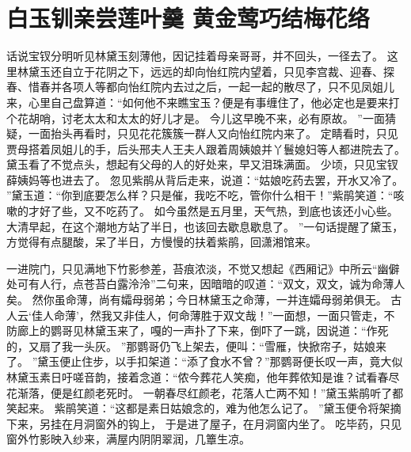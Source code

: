\chapter{白玉钏亲尝莲叶羹 \quad 黄金莺巧结梅花络}
\par
话说宝钗分明听见林黛玉刻薄他，因记挂着母亲哥哥，并不回头，一径去了。
这里林黛玉还自立于花阴之下，远远的却向怡红院内望着，只见李宫裁、迎春、探春、惜春并各项人等都向怡红院内去过之后，一起一起的散尽了，只不见凤姐儿来，心里自己盘算道：“如何他不来瞧宝玉？便是有事缠住了，他必定也是要来打个花胡哨，讨老太太和太太的好儿才是。
今儿这早晚不来，必有原故。
”一面猜疑，一面抬头再看时，只见花花簇簇一群人又向怡红院内来了。
定睛看时，只见贾母搭着凤姐儿的手，后头邢夫人王夫人跟着周姨娘并丫鬟媳妇等人都进院去了。
黛玉看了不觉点头，想起有父母的人的好处来，早又泪珠满面。
少顷，只见宝钗薛姨妈等也进去了。
忽见紫鹃从背后走来，说道：“姑娘吃药去罢，开水又冷了。
”黛玉道：“你到底要怎么样？只是催，我吃不吃，管你什么相干！”紫鹃笑道：“咳嗽的才好了些，又不吃药了。
如今虽然是五月里，天气热，到底也该还小心些。
大清早起，在这个潮地方站了半日，也该回去歇息歇息了。
”一句话提醒了黛玉，方觉得有点腿酸，呆了半日，方慢慢的扶着紫鹃，回潇湘馆来。
\par
一进院门，只见满地下竹影参差，苔痕浓淡，不觉又想起《西厢记》中所云“幽僻处可有人行，点苍苔白露泠泠”二句来，因暗暗的叹道：“双文，双文，诚为命薄人矣。
然你虽命薄，尚有孀母弱弟；今日林黛玉之命薄，一并连孀母弱弟俱无。
古人云‘佳人命薄’，然我又非佳人，何命薄胜于双文哉！”一面想，一面只管走，不防廊上的鹦哥见林黛玉来了，嘎的一声扑了下来，倒吓了一跳，因说道：“作死的，又扇了我一头灰。
”那鹦哥仍飞上架去，便叫：“雪雁，快掀帘子，姑娘来了。
”黛玉便止住步，以手扣架道：“添了食水不曾？”那鹦哥便长叹一声，竟大似林黛玉素日吁嗟音韵，接着念道：“侬今葬花人笑痴，他年葬侬知是谁？试看春尽花渐落，便是红颜老死时。
一朝春尽红颜老，花落人亡两不知！”黛玉紫鹃听了都笑起来。
紫鹃笑道：“这都是素日姑娘念的，难为他怎么记了。
”黛玉便令将架摘下来，另挂在月洞窗外的钩上，
于是进了屋子，在月洞窗内坐了。
吃毕药，只见窗外竹影映入纱来，满屋内阴阴翠润，几簟生凉。
